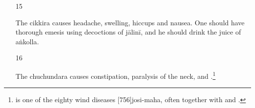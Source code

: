 \begin{translation}
\begin{itemize}
\item[15]

The \Gls{cikkira} causes headache, swelling, hiccups and nausea.  One
should have thorough emesis using
decoctions of \gls{jālinī}, and he should drink
the juice of \gls{aṅkolla}.

\item[16]

The \Gls{chuchundara} causes constipation, paralysis of the neck, and 
.\footnote{ is one of the eighty 
wind diseases [756]{josi-maha}, often together with  
and .}

\end{itemize}

    \end{translation}
\endinput




%

